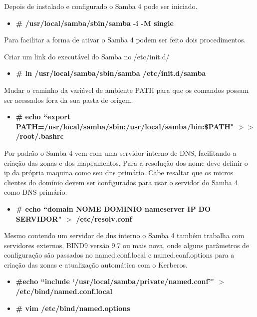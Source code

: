 Depois de instalado e configurado o Samba 4 pode ser iniciado.

\begin{itemize}
	\item \textbf{\# /usr/local/samba/sbin/samba -i -M single}
\end{itemize}

Para facilitar a forma de ativar o Samba 4 podem ser feito dois procedimentos.

Criar um link do executável do Samba no /etc/init.d/

\begin{itemize}
	\item \textbf{\# ln /usr/local/samba/sbin/samba /etc/init.d/samba}
\end{itemize}

Mudar o caminho da variável de ambiente PATH para que os comandos possam ser acessados fora da sua pasta de origem.

\begin{itemize}
	\item \textbf{\# echo ``export PATH=/usr/local/samba/sbin:/usr/local/samba/bin:\$PATH" $>$$>$ /root/.bashrc}
\end{itemize}

Por padrão o Samba 4 vem com uma servidor interno de DNS, facilitando a criação das zonas e dos mapeamentos. Para a resolução dos nome deve definir o ip da própria maquina como seu dns primário. Cabe resaltar que os micros clientes do domínio devem ser configurados para usar o servidor do Samba 4 como DNS primário.

\begin{itemize}
	\item \textbf{\# echo ``domain NOME DOMINIO nameserver IP DO SERVIDOR" $>$ /etc/resolv.conf}
\end{itemize}

Mesmo contendo um servidor de dns interno o Samba 4 também trabalha com servidores externos, BIND9 versão 9.7 ou mais nova, onde alguns parâmetros de configuração são passados no named.conf.local e named.conf.options para a criação das zonas e atualização automática com o Kerberos.

\begin{itemize}
	\item \textbf{\#echo ``include `/usr/local/samba/private/named.conf'" $>$ /etc/bind/named.conf.local}
	\item \textbf{\# vim /etc/bind/named.options}
\end{itemize}


